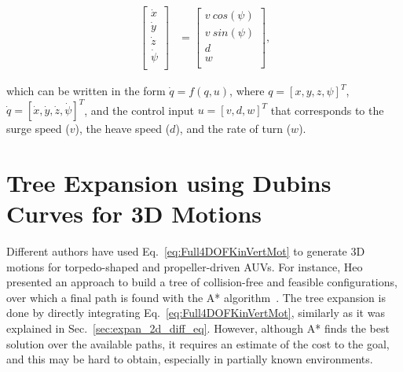 \begin{equation}
\label{eq:Full4DOFKinVertMot}
\begin{split}
	\begin{bmatrix}
		\dot{x}\\
		\dot{y}\\
		\dot{z}\\ 
		\dot{\psi}\\
	\end{bmatrix} & =
	\begin{bmatrix}
		v\ cos\left(\psi\right)\\
		v\ sin\left(\psi\right)\\
		d\\
		w\\
	\end{bmatrix}
	\text{,}
\end{split}
\end{equation}

which can be written in the form $\dot{q}=f\left(q,u\right)$, where $q=\left[x,
y, z, \psi\right]^T$, $\dot{q}=\left[\dot{x}, \dot{y}, \dot{z},
\dot{\psi}\right]^T$, and the control input $u=\left[v, d, w\right]^T$ that
corresponds to the surge speed ($v$), the heave speed ($d$), and the rate of
turn ($w$).

\section{Tree Expansion using Dubins Curves for 3D Motions}

Different authors have used Eq.~\eqref{eq:Full4DOFKinVertMot} to generate
\ac{3D} motions for torpedo-shaped and propeller-driven \acp{AUV}. For instance,
Heo \etal presented an approach to build a tree of collision-free and feasible
configurations, over which a final path is found with the A*
algorithm~\cite{Heo2013}. The tree expansion is done by directly integrating
Eq.~\eqref{eq:Full4DOFKinVertMot}, similarly as it was explained in
Sec.~\ref{sec:expan_2d_diff_eq}. However, although A* finds the best solution
over the available paths, it requires an estimate of the cost to the goal, and
this may be hard to obtain, especially in partially known environments.


